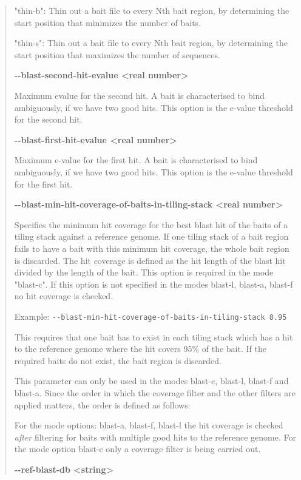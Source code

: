 \documentclass[a4paper,pdflatex,11pt]{article}
\begin{document}
\begin{quote}
"thin-b": Thin out a bait file to every Nth bait region, by determining the
start position that minimizes the number of baits.

"thin-s": Thin out a bait file to every Nth bait region, by determining the
start position that maximizes the number of sequences.

\textbf{-\/-blast-second-hit-evalue \textless real number\textgreater }

Maximum evalue for the second hit. A bait is characterised to bind
ambiguously, if we have two good hits. This option is the e-value
threshold for the second hit.

\textbf{-\/-blast-first-hit-evalue \textless real number\textgreater }

Maximum e-value for the first hit. A bait is characterised to bind
ambiguously, if we have two good hits. This option is the e-value
threshold for the first hit.

\textbf{-\/-blast-min-hit-coverage-of-baits-in-tiling-stack \textless real number\textgreater }

Specifies the minimum hit coverage for the best blast hit of the baits of a tiling stack against a reference genome.
If one tiling stack of a bait region
fails to have a bait with this minimum hit coverage, the whole bait region
is discarded. 
The hit coverage is defined as the hit length of the blast hit divided by the length of the bait.
This option is required in the mode "blast-c". If this option is not specified in the modes blast-l, blast-a, blast-f
no hit coverage is checked.

Example: \verb+--blast-min-hit-coverage-of-baits-in-tiling-stack 0.95+

This requires that one bait has to exist in each tiling stack which has
a hit to the reference genome where the hit covers 95\% of the bait. If
the required baits do not exist, the bait region is discarded.

This parameter can only be used in the modes blast-c, blast-l, blast-f and blast-a. Since
the order in which the coverage filter and the other filters are applied
matters, the order is defined as follows:

For the mode options: blast-a, blast-f, blast-l the hit coverage is
checked \emph{after} filtering for baits with multiple good hits to the
reference genome. For the mode option blast-c only a coverage filter is being carried out.

\textbf{-\/-ref-blast-db \textless string\textgreater }


\end{quote}
\end{document}
